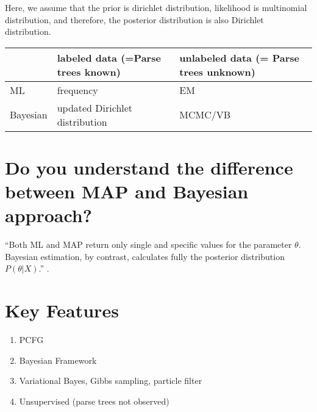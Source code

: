 \documentclass[11pt]{article}
\begin{document}
Here, we assume that the prior is dirichlet distribution, likelihood is multinomial distribution, and therefore, the posterior distribution is also Dirichlet distribution.

\begin{center}
    \begin{tabular}{|l|l|l|}
    \hline
             & labeled data (=Parse trees known) & unlabeled data (= Parse trees unknown)  \\\hline
    ML       & frequency                         & EM              \\\hline
    Bayesian & updated Dirichlet distribution    & MCMC/VB         \\\hline
    \end{tabular}
\end{center}

\section{Do you understand the difference between MAP and Bayesian approach?}
``Both ML and MAP return only single and specific values for the parameter $\theta$. Bayesian estimation, by contrast, calculates fully the posterior distribution $P(\theta|X)$.'' \cite{map_vs_bayesian}.

\section{Key Features}
\begin{enumerate}
 \item PCFG
 \item Bayesian Framework
 \item Variational Bayes, Gibbs sampling, particle filter
 \item Unsupervised (parse trees not observed)
\end{enumerate}
\end{document}
